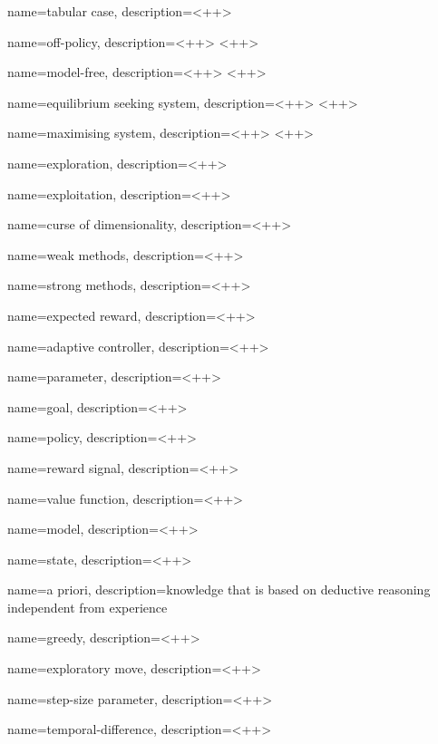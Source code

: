 {
    name={tabular case},
    description={}<++>
}

{
    name=off-policy,
    description={}<++>
}<++>

{
    name=model-free,
    description={}<++>
}<++>

{
    name={equilibrium seeking system},
    description={}<++>
}<++>

{
    name={maximising system},
    description={}<++>
}<++>

{
    name={exploration},
    description={}<++>
}

{
    name={exploitation},
    description={}<++>
}

{
    name={curse of dimensionality},
    description={}<++>
}

{
    name={weak methods},
    description={}<++>
}

{
    name={strong methods},
    description={}<++>
}

{
    name={expected reward},
    description={}<++>
}

{
    name={adaptive controller},
    description={}<++>
}

{
    name={parameter},
    description={}<++>
}

{
    name={goal},
    description={}<++>
}

{
    name={policy},
    description={}<++>
}

{
    name={reward signal},
    description={}<++>
}

{
    name={value function},
    description={}<++>
}

{
    name={model},
    description={}<++>
}

{
    name={state},
    description={}<++>
}

{
    name={a priori},
    description={knowledge that is based on deductive reasoning independent
    from experience}
}

{
    name={greedy},
    description={}<++>
}

{
    name={exploratory move},
    description={}<++>
}

{
    name={step-size parameter},
    description={}<++>
}

{
    name={temporal-difference},
    description={}<++>
}

